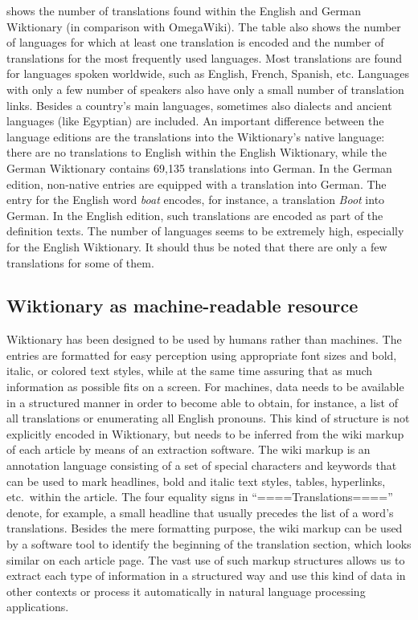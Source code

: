 \documentclass[output=paper]{LSP/langsci}
\begin{document}
 shows the number of translations found within the English and German Wiktionary (in comparison with OmegaWiki). The table also shows the number of languages for which at least one translation is encoded and the number of translations for the most frequently used languages. Most translations are found for languages spoken  worldwide, such as English, French, Spanish, etc. Languages with only a few number of speakers also have only a small number of translation links. Besides a country's main languages, sometimes also dialects and ancient languages (like Egyptian) are included. An important difference between the language editions are the translations into the Wiktionary's native language: there are no translations to English within the English Wiktionary,  while the German Wiktionary contains 69,135 translations into German. In the German edition, non-native entries are equipped with a translation into German. The entry for the English word \textit{boat} encodes, for 
instance,
 a translation \textit{Boot} into German. In the English edition, such translations are encoded as part of the definition texts. The number of languages seems to be extremely high, especially for the English Wiktionary. It should thus be noted that there are only a few translations for some of them.

\subsection{Wiktionary as machine-readable resource}

Wiktionary has been designed to be used by humans rather than machines. 
The entries are formatted for easy perception using appropriate font sizes and bold, italic, or colored text styles, while at the same time assuring that as much information as possible fits on a screen. 
For machines, data needs to be available in a structured manner in order to become able to obtain, for instance, a list of all translations or enumerating all English pronouns. 
This kind of structure is not explicitly encoded in Wiktionary, but needs to be inferred from the wiki markup of each article by means of an extraction software. The wiki markup is an annotation language consisting of a set of special characters and keywords that can be used to mark headlines, bold and italic text styles, tables, hyperlinks, etc.\ within the article. The four equality signs in ``====Translations===='' denote, for example, a small headline that usually precedes the list of a word's translations. Besides the mere formatting purpose, the wiki markup can be used by a software tool to identify the beginning of the translation section, which looks similar on each article page. The vast use of such markup structures allows us to extract each type of information in a structured way and use this kind of data in other contexts or process it automatically in natural language processing applications.
\end{document}
